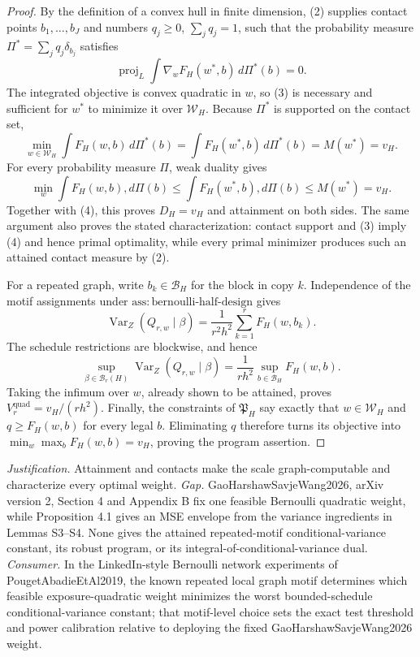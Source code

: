 \documentclass{article}
\begin{document}
\begin{proof}
By the definition of a convex hull in finite dimension, (2) supplies contact points \(b_1,\ldots,b_J\) and numbers \(q_j\ge0\), \(\sum_jq_j=1\), such that the probability measure \(\Pi^*=\sum_jq_j\delta_{b_j}\) satisfies
\[
\operatorname{proj}_L\int\nabla_wF_H(w^*,b)\,d\Pi^*(b)=0. \tag{3}
\]
The integrated objective is convex quadratic in \(w\), so (3) is necessary and sufficient for \(w^*\) to minimize it over \(\mathcal W_H\).  Because \(\Pi^*\) is supported on the contact set,
\[
\min_{w\in\mathcal W_H}\int F_H(w,b)\,d\Pi^*(b)
=\int F_H(w^*,b)\,d\Pi^*(b)=M(w^*)=v_H. \tag{4}
\]
For every probability measure \(\Pi\), weak duality gives
\[
\min_w\int F_H(w,b),d\Pi(b)
\le \int F_H(w^*,b),d\Pi(b)
\le M(w^*)=v_H.
\]
Together with (4), this proves \(D_H=v_H\) and attainment on both sides.  The same argument also proves the stated characterization: contact support and (3) imply (4) and hence primal optimality, while every primal minimizer produces such an attained contact measure by (2).

For a repeated graph, write \(b_k\in\mathcal B_H\) for the block in copy \(k\).  Independence of the motif assignments under \(\mathrm{ass:bernoulli\text{-}half\text{-}design}\) gives
\[
\operatorname{Var}_Z(Q_{r,w}\mid\beta)
=\frac1{r^2h^2}\sum_{k=1}^rF_H(w,b_k).
\]
The schedule restrictions are blockwise, and hence
\[
\sup_{\beta\in\mathcal B_r(H)}\operatorname{Var}_Z(Q_{r,w}\mid\beta)
=\frac1{rh^2}\sup_{b\in\mathcal B_H}F_H(w,b).
\]
Taking the infimum over \(w\), already shown to be attained, proves \(V_r^{\mathrm{quad}}=v_H/(rh^2)\).  Finally, the constraints of \(\mathfrak P_H\) say exactly that \(w\in\mathcal W_H\) and \(q\ge F_H(w,b)\) for every legal \(b\).  Eliminating \(q\) therefore turns its objective into \(\min_w\max_bF_H(w,b)=v_H\), proving the program assertion.
\end{proof}
\par\smallskip\noindent \textit{Justification.} Attainment and contacts make the scale graph-computable and characterize every optimal weight. \textit{Gap.} GaoHarshawSavjeWang2026, arXiv version 2, Section 4 and Appendix B fix one feasible Bernoulli quadratic weight, while Proposition 4.1 gives an MSE envelope from the variance ingredients in Lemmas S3--S4. None gives the attained repeated-motif conditional-variance constant, its robust program, or its integral-of-conditional-variance dual. \textit{Consumer.} In the LinkedIn-style Bernoulli network experiments of PougetAbadieEtAl2019, the known repeated local graph motif determines which feasible exposure-quadratic weight minimizes the worst bounded-schedule conditional-variance constant; that motif-level choice sets the exact test threshold and power calibration relative to deploying the fixed GaoHarshawSavjeWang2026 weight.
\end{document}
